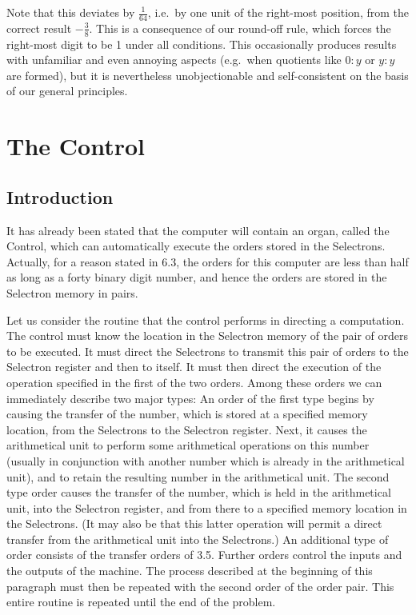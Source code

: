 \documentclass[12pt]{amsart}
\begin{document}
Note that this deviates by $\frac{1}{64}$, i.e.\ by one unit of the right-most position, from the correct result $-\frac{3}{8}$. This is a consequence of our round-off rule, which forces the right-most digit to be 1 under all conditions. This occasionally produces results with unfamiliar and even annoying aspects (e.g.\ when quotients like $0:y$ or $y:y$ are formed), but it is nevertheless unobjectionable and self-consistent on the basis of our general principles.

\section{The Control}

\subsection{Introduction}
It has already been stated that the computer will contain an organ, called the Control, which can automatically execute the orders stored in the Selectrons. Actually, for a reason stated in 6.3, the orders for this computer are less than half as long as a forty binary digit number, and hence the orders are stored in the Selectron memory in pairs.

Let us consider the routine that the control performs in directing a computation. The control must know the location in the Selectron memory of the pair of orders to be executed. It must direct the Selectrons to transmit this pair of orders to the Selectron register and then to itself. It must then direct the execution of the operation specified in the first of the two orders. Among these orders we can immediately describe two major types: An order of the first type begins by causing the transfer of the number, which is stored at a specified memory location, from the Selectrons to the Selectron register. Next, it causes the arithmetical unit to perform some arithmetical operations on this number (usually in conjunction with another number which is already in the arithmetical unit), and to retain the resulting number in the arithmetical unit. The second type order causes the transfer of the number, which is held in the arithmetical unit, into the Selectron register, and from there to a specified memory location in the Selectrons. (It may also be that this latter operation will permit a direct transfer from the arithmetical unit into the Selectrons.) An additional type of order consists of the transfer orders of 3.5. Further orders control the inputs and the outputs of the machine. The process described at the beginning of this paragraph must then be repeated with the second order of the order pair. This entire routine is repeated until the end of the problem.
\end{document}
